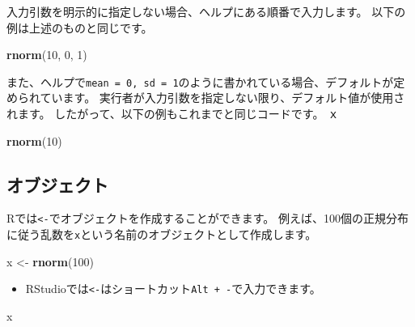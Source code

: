 \documentclass[]{bxjsarticle}
\newenvironment{Shaded}{\begin{snugshade}}{\end{snugshade}}
\newcommand{\DecValTok}[1]{\textcolor[rgb]{0.00,0.00,0.81}{#1}}
\newcommand{\KeywordTok}[1]{\textcolor[rgb]{0.13,0.29,0.53}{\textbf{#1}}}
\newcommand{\NormalTok}[1]{#1}
\newcommand{\StringTok}[1]{\textcolor[rgb]{0.31,0.60,0.02}{#1}}
\providecommand{\tightlist}{%
  \setlength{\itemsep}{0pt}\setlength{\parskip}{0pt}}
\begin{document}
入力引数を明示的に指定しない場合、ヘルプにある順番で入力します。
以下の例は上述のものと同じです。

\begin{Shaded}
\begin{Highlighting}[]
\KeywordTok{rnorm}\NormalTok{(}\DecValTok{10}\NormalTok{, }\DecValTok{0}\NormalTok{, }\DecValTok{1}\NormalTok{)}
\end{Highlighting}
\end{Shaded}

また、ヘルプで\texttt{mean\ =\ 0,\ sd\ =\ 1}のように書かれている場合、デフォルトが定められています。
実行者が入力引数を指定しない限り、デフォルト値が使用されます。
したがって、以下の例もこれまでと同じコードです。
ｘ

\begin{Shaded}
\begin{Highlighting}[]
\KeywordTok{rnorm}\NormalTok{(}\DecValTok{10}\NormalTok{)}
\end{Highlighting}
\end{Shaded}

\hypertarget{ux30aaux30d6ux30b8ux30a7ux30afux30c8}{%
\subsection{オブジェクト}\label{ux30aaux30d6ux30b8ux30a7ux30afux30c8}}

Rでは\texttt{\textless{}-}でオブジェクトを作成することができます。
例えば、100個の正規分布に従う乱数を\texttt{x}という名前のオブジェクトとして作成します。

\begin{Shaded}
\begin{Highlighting}[]
\NormalTok{x <-}\StringTok{ }\KeywordTok{rnorm}\NormalTok{(}\DecValTok{100}\NormalTok{)}
\end{Highlighting}
\end{Shaded}

\begin{itemize}
\tightlist
\item
  RStudioでは\texttt{\textless{}-}はショートカット\texttt{Alt\ +\ -}で入力できます。
\end{itemize}

\begin{Shaded}
\begin{Highlighting}[]
\NormalTok{x}
\end{Highlighting}
\end{Shaded}
\end{document}
